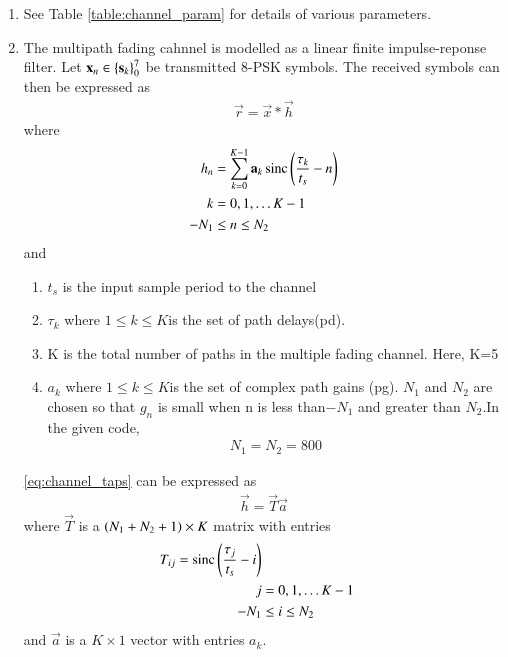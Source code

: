 \begin{enumerate}[label=\thesubsection.\arabic*.,ref=\thesubsection.\theenumi]

\item See Table \ref{table:channel_param} for details of various parameters.
\begin{table}[!ht]
\centering

\caption{}
\label{table:channel_param}
\end{table}

\item The multipath fading cahnnel is modelled as a linear finite impulse-reponse filter.
Let $\mathbf{x}_n \in \left\{\mathbf{s}_k\right\}_{0}^{7}$ be transmitted 8-PSK symbols.  The received symbols can then be expressed as
\begin{align}
\vec{r} = \vec{x} * \vec{h}
\end{align}
where
\begin{align}
\label{eq:channel_taps}
h_n &= 
\sum_{k=0}^{K-1}\mathbf{a}_k \operatorname*{sinc}{\left(\frac{\tau_k}{t_s}-n\right)}
\\
k &= 0, 1, \dots K-1
\\
-N_1 &\leq n \leq N_2
\end{align}
and
\begin{enumerate}
\item $t_s$ is the input sample period to the channel
\item $\tau_k$ where $1\leq k \leq K$is the set of path delays(pd).
\item K is the total number of paths in the multiple fading channel. Here, K=5 
\item $a_k$ where $1\leq k \leq K$is the set of complex path gains (pg).
$N_1$ and $N_2$ are chosen so that $g_n$ is small when n is less than$-N_1$ and greater than $N_2$.In the given code,
\begin{align}
N_1=N_2=800
\end{align}
\end{enumerate}
\eqref{eq:channel_taps} can be expressed as
\begin{align}
\label{eq:channel_taps_mat}
\vec{h}=
\vec{T}\vec{a}
\end{align}
where $\vec{T}$ is a $\left(N_1+N_2+1\right)\times K$ matrix with entries
\begin{align}
T_{ij} = \operatorname*{sinc}{\left(\frac{\tau_j}{t_s}-i\right)}
\\
j &= 0, 1, \dots K-1
\\
-N_1 &\leq i \leq N_2
\end{align}
and $\vec{a}$ is a $K\times 1$ vector with entries $a_k$.
\end{enumerate}
